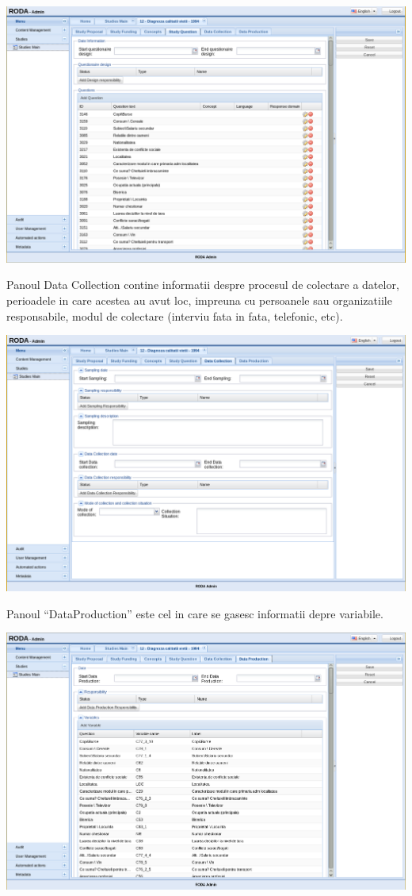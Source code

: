 \includegraphics[width=16cm]{img/studyedit-questions}

Panoul Data Collection contine informatii despre procesul de colectare a datelor, perioadele in care acestea au avut loc, impreuna cu persoanele sau organizatiile responsabile, modul de colectare (interviu fata in fata, telefonic, etc). 

\includegraphics[width=16cm]{img/studyedit-datacollection}

Panoul “DataProduction” este cel in care se gasesc informatii depre variabile. 

\includegraphics[width=16cm]{img/studyedit-dataproduction}


